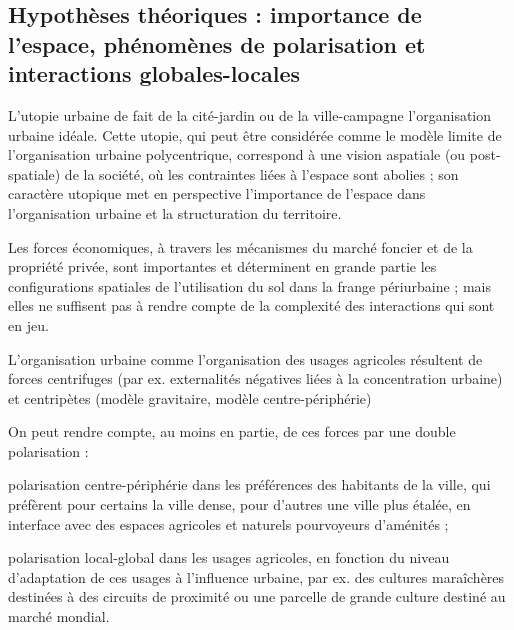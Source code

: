 \subsection{Hypothèses théoriques :
   importance de l'espace, phénomènes de polarisation
   et interactions globales-locales}

\startitemize[n]

\item	L'utopie urbaine de \citet{howard_tomorrow_2003} fait de la cité-jardin ou de la ville-campagne
	l'organisation urbaine idéale.
	Cette utopie, qui peut être considérée comme le modèle limite de l'organisation urbaine polycentrique,
	correspond à une vision aspatiale (ou post-spatiale)
	de la société, où les contraintes liées à l'espace sont abolies ;
	son caractère utopique met en perspective
	l'importance de l'espace dans l'organisation urbaine
	et la structuration du territoire.

\item 	Les forces économiques, à travers les mécanismes
	du marché foncier et de la propriété privée,
	sont importantes et déterminent en grande partie
	les configurations spatiales de l'utilisation du sol
	dans la frange périurbaine ;
	mais elles ne suffisent pas à rendre compte
	de la complexité des interactions qui sont en jeu.

\item	L'organisation urbaine comme l'organisation
	des usages agricoles résultent
	de forces centrifuges (par ex. externalités négatives
	liées à la concentration urbaine) et centripètes
	(modèle gravitaire, modèle centre-périphérie)

	On peut rendre compte, au moins en partie, de ces forces
	par une double polarisation :

	\startitemize[a,packed]

    \item 	polarisation centre-périphérie
     	dans les préférences des habitants de la ville,
		qui préfèrent pour certains la ville dense,
		pour d'autres une ville plus étalée, en interface avec des
		espaces agricoles et naturels pourvoyeurs d'aménités ;

    \item	polarisation local-global dans les usages agricoles,
		en fonction du niveau d'adaptation de ces usages
		à l'influence urbaine, par ex. des cultures maraîchères
		destinées à des circuits de proximité ou une parcelle
		de grande culture destiné au marché mondial.

	\stopitemize

